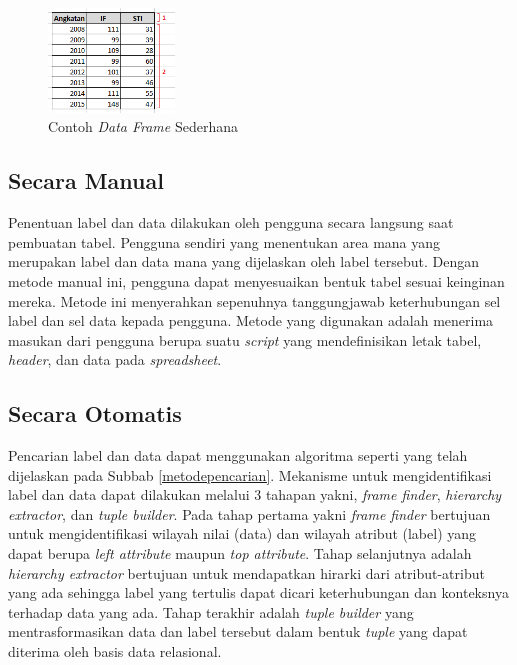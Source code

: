 \begin{figure}[htb]
    \centering
    \includegraphics[width=0.3\textwidth]{resources/chapter-3-simple-dataframe.png}
    \caption{Contoh \textit{Data Frame} Sederhana}
	\label{DataFrameSederhana}
\end{figure}

	\subsection{Secara Manual}
	Penentuan label dan data dilakukan oleh pengguna secara langsung saat pembuatan tabel. Pengguna sendiri yang menentukan area mana yang merupakan label dan data mana yang dijelaskan oleh label tersebut. Dengan metode manual ini, pengguna dapat menyesuaikan bentuk tabel sesuai keinginan mereka. Metode ini menyerahkan sepenuhnya tanggungjawab keterhubungan sel label dan sel data kepada pengguna. Metode yang digunakan adalah menerima masukan dari pengguna berupa suatu \textit{script} yang mendefinisikan letak tabel, \textit{header}, dan data pada \textit{spreadsheet}.

	\subsection{Secara Otomatis}
	Pencarian label dan data dapat menggunakan algoritma seperti yang telah dijelaskan pada Subbab \ref{metodepencarian}. Mekanisme untuk mengidentifikasi label dan data dapat dilakukan melalui 3 tahapan yakni, \textit{frame finder}, \textit{hierarchy extractor}, dan \textit{tuple builder}. Pada tahap pertama yakni \textit{frame finder} bertujuan untuk mengidentifikasi wilayah nilai (data) dan wilayah atribut (label) yang dapat berupa \textit{left attribute} maupun \textit{top attribute}. Tahap selanjutnya adalah \textit{hierarchy extractor} bertujuan untuk mendapatkan hirarki dari atribut-atribut yang ada sehingga label yang tertulis dapat dicari keterhubungan dan konteksnya terhadap data yang ada. Tahap terakhir adalah \textit{tuple builder} yang mentrasformasikan data dan label tersebut dalam bentuk \textit{tuple} yang dapat diterima oleh basis data relasional.


